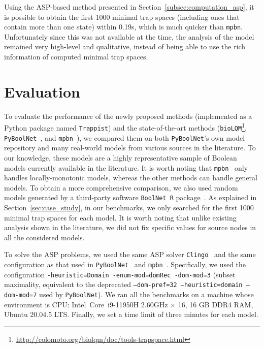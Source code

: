\documentclass[preprint,12pt]{elsarticle}
\begin{document}
Using the ASP-based method presented in Section~\ref{subsec:computation_asp}, it is possible to obtain the first 1000 minimal trap spaces (including ones that contain more than one state) within 0.19s, which is much quicker than \texttt{mpbn}.
Unfortunately since this was not available at the time, the analysis of the model remained very high-level and qualitative, instead of being able to use the rich information of computed minimal trap spaces.

\section{Evaluation}%
\label{sec:eval}

To evaluate the performance of the newly proposed methods (implemented as a Python package named \texttt{Trappist}) and the state-of-the-art methods (\texttt{bioLQM}\footnote{\url{http://colomoto.org/biolqm/doc/tools-trapspace.html}}, \texttt{PyBoolNet}~\cite{klarner2015computing,klarner2017pyboolnet}, and \texttt{mpbn}~\cite{Paulev2020}), we compared them on both \texttt{PyBoolNet}'s own model repository and many real-world models from various sources in the literature.
To our knowledge, these models are a highly representative sample of Boolean models currently available in the literature.
It is worth noting that \texttt{mpbn}~\cite{Paulev2020} only handles locally-monotonic models, whereas the other methods can handle general models.
To obtain a more comprehensive comparison, we also used random models generated by a third-party software \texttt{BoolNet R} package~\cite{mussel2010boolnet}.
As explained in Section~\ref{sec:case_study}, in our benchmarks, we only searched for the first 1000 minimal trap spaces for each model.
It is worth noting that unlike existing analysis shown in the literature, we did not fix specific values for source nodes in all the considered models.

To solve the ASP problems, we used the same ASP solver \texttt{Clingo}~\cite{DBLP:journals/aicom/GebserKKOSS11} and the same configuration as that used in \texttt{PyBoolNet}~\cite{klarner2015computing,klarner2017pyboolnet} and \texttt{mpbn}~\cite{Paulev2020}.
Specifically, we used the configuration \texttt{-heuristic=Domain -enum-mod=domRec -dom-mod=3} (subset maximality, equivalent to the deprecated \texttt{--dom-pref=32 --heuristic=domain --dom-mod=7} used by \texttt{PyBoolNet}).
We ran all the benchmarks on a machine whose environment is CPU\@: Intel\textregistered\ Core\texttrademark\ i9-11950H 2.60GHz × 16, 16 GB DDR4 RAM, Ubuntu 20.04.5 LTS\@.
Finally, we set a time limit of three minutes for each model.
\end{document}
